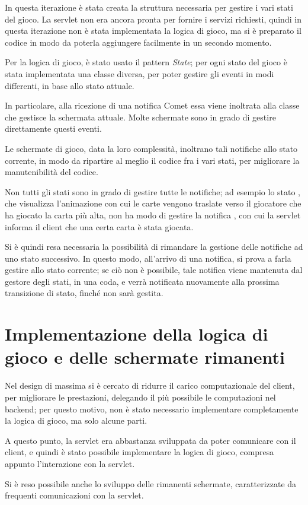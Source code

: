 \documentclass[a4paper,12pt,final]{article}
\begin{document}
In questa iterazione \`e stata creata la struttura necessaria per gestire
i vari stati del gioco. La servlet non era ancora pronta per fornire i servizi
richiesti, quindi in questa iterazione non \`e stata implementata la logica di
gioco, ma si \`e preparato il codice in modo da poterla aggiungere facilmente
in un secondo momento.

Per la logica di gioco, \`e stato usato il pattern \emph{State}; per ogni
stato del gioco \`e stata implementata una classe diversa, per poter gestire
gli eventi in modi differenti, in base allo stato attuale.

In particolare, alla ricezione di una notifica Comet essa viene inoltrata
alla classe che gestisce la schermata attuale.
Molte schermate sono in grado di gestire direttamente questi eventi.

Le schermate di gioco, data la loro complessit\`a, inoltrano tali notifiche
allo stato corrente, in modo da ripartire al meglio il codice fra i vari
stati, per migliorare la manutenibilit\`a del codice.

Non tutti gli stati sono in grado di gestire tutte le notifiche; ad esempio
lo stato \verb@EndOfTrickState@, che visualizza l'animazione con cui le carte
vengono traslate verso il giocatore che ha giocato la carta pi\`u alta, non ha
modo di gestire la notifica \verb@CardPlayed@, con cui la servlet informa il
client che una certa carta \`e stata giocata.

Si \`e quindi resa necessaria la possibilit\`a di rimandare la gestione delle
notifiche ad uno stato successivo. In questo modo, all'arrivo di una notifica,
si prova a farla gestire allo stato corrente; se ci\`o non \`e possibile, tale
notifica viene mantenuta dal gestore degli stati, in una coda, e verr\`a
notificata nuovamente alla prossima transizione di stato, finch\'e non sar\`a
gestita.

\section{Implementazione della logica di gioco e delle schermate rimanenti}

Nel design di massima si \`e cercato di ridurre il carico computazionale
del client, per migliorare le prestazioni, delegando il pi\`u possibile
le computazioni nel backend; per questo motivo, non \`e stato necessario
implementare completamente la logica di gioco, ma solo alcune parti.

A questo punto, la servlet era abbastanza sviluppata da poter comunicare con
il client, e quindi \`e stato possibile implementare la logica di gioco,
compresa appunto l'interazione con la servlet.

Si \`e reso possibile anche lo sviluppo delle rimanenti schermate,
caratterizzate da frequenti comunicazioni con la servlet.
\end{document}
